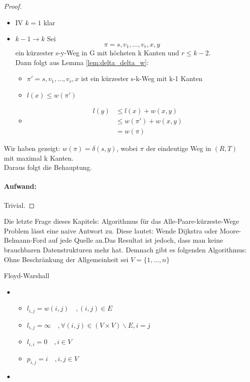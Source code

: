 \begin{proof}
\begin{itemize}[label=$\lozenge$, itemsep=2ex]
	\item IV \underline{$k=1$} klar
	\item \underline{$k-1 \to k$} Sei 
		\[
		\pi=s,v_1,\ldots,v_r,x,y
		\]
	ein kürzester s-y-Weg in G mit höchsten k Kanten und $r\le k-2$. \\
	Dann folgt aus Lemma \ref{lem:delta_delta_w}:
	\begin{itemize}
		\item $\pi'=s,v_1,\ldots,v_r,x$ ist ein kürzester s-k-Weg mit k-1 Kanten
		\item $l(x)\le w(\pi')$
		\item \begin{align*}
				l(y)&\le l(x)+w(x,y) \\
				    &\le w(\pi') + w(x,y) \\
				    &= w(\pi)
		\end{align*}
	\end{itemize}
\end{itemize}
Wir haben gezeigt: $w(\pi) = \delta(s,y)$, wobei $\pi$ der eindeutige Weg in $(R,T)$ mit maximal k Kanten. \\
Daraus folgt die Behauptung.
\paragraph{Aufwand:} Trivial.
\end{proof}
Die letzte Frage dieses Kapitels: Algorithmus für das Alle-Paare-kürzeste-Wege Problem lässt eine naive Antwort zu. Diese lautet: Wende Dijkstra oder Moore-Belmann-Ford auf jede Quelle an.Das Resultat ist jedoch, dass man keine brauchbaren Datenstrukturen mehr hat. Demnach gibt es folgenden Algorithmus:\\
Ohne Beschränkung der Allgemeinheit sei $V=\{1,\ldots,n\} $ \\
\begin{algorithm}[H]
	\label{alg:fw}
	\caption{Floyd-Warshall}
	\begin{itemize}
		\item \begin{itemize}[label={}]
				\item $l_{i,j} = w(i,j) \quad,(i,j) \in E$
				\item $l_{i,j} = \infty \quad,\forall (i,j) \in (V\times V)\backslash E, i = j$
				\item $l_{i,i} = 0 \quad, i \in V$
				\item $p_{i,j} = i \quad, i,j \in V$
			\end{itemize}
		
		\item {}
\end{itemize}
\end{algorithm}
